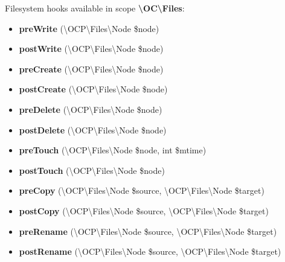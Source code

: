 \documentclass[letterpaper,10pt,english]{sphinxmanual}
\begin{document}
Filesystem hooks available in scope \textbf{\textbackslash{}OC\textbackslash{}Files}:
\begin{itemize}
\item {} 
\textbf{preWrite} (\textbackslash{}OCP\textbackslash{}Files\textbackslash{}Node \$node)

\item {} 
\textbf{postWrite} (\textbackslash{}OCP\textbackslash{}Files\textbackslash{}Node \$node)

\item {} 
\textbf{preCreate} (\textbackslash{}OCP\textbackslash{}Files\textbackslash{}Node \$node)

\item {} 
\textbf{postCreate} (\textbackslash{}OCP\textbackslash{}Files\textbackslash{}Node \$node)

\item {} 
\textbf{preDelete} (\textbackslash{}OCP\textbackslash{}Files\textbackslash{}Node \$node)

\item {} 
\textbf{postDelete} (\textbackslash{}OCP\textbackslash{}Files\textbackslash{}Node \$node)

\item {} 
\textbf{preTouch} (\textbackslash{}OCP\textbackslash{}Files\textbackslash{}Node \$node, int \$mtime)

\item {} 
\textbf{postTouch} (\textbackslash{}OCP\textbackslash{}Files\textbackslash{}Node \$node)

\item {} 
\textbf{preCopy} (\textbackslash{}OCP\textbackslash{}Files\textbackslash{}Node \$source, \textbackslash{}OCP\textbackslash{}Files\textbackslash{}Node \$target)

\item {} 
\textbf{postCopy} (\textbackslash{}OCP\textbackslash{}Files\textbackslash{}Node \$source, \textbackslash{}OCP\textbackslash{}Files\textbackslash{}Node \$target)

\item {} 
\textbf{preRename} (\textbackslash{}OCP\textbackslash{}Files\textbackslash{}Node \$source, \textbackslash{}OCP\textbackslash{}Files\textbackslash{}Node \$target)

\item {} 
\textbf{postRename} (\textbackslash{}OCP\textbackslash{}Files\textbackslash{}Node \$source, \textbackslash{}OCP\textbackslash{}Files\textbackslash{}Node \$target)

\end{itemize}
\end{document}
